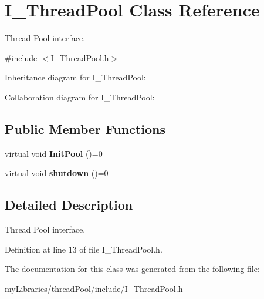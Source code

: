 \hypertarget{classI__ThreadPool}{}\section{I\+\_\+\+Thread\+Pool Class Reference}
\label{classI__ThreadPool}


Thread Pool interface.  




{\ttfamily \#include $<$I\+\_\+\+Thread\+Pool.\+h$>$}



Inheritance diagram for I\+\_\+\+Thread\+Pool\+:


Collaboration diagram for I\+\_\+\+Thread\+Pool\+:
\subsection*{Public Member Functions}
\begin{DoxyCompactItemize}
\item 
\mbox{\label{classI__ThreadPool_a28e12ea1cb5ee9c06a60f6dc1de49a58}} 
virtual void {\bfseries Init\+Pool} ()=0
\item 
\mbox{\label{classI__ThreadPool_a4d059af312bca3020454dab83a9a6604}} 
virtual void {\bfseries shutdown} ()=0
\end{DoxyCompactItemize}


\subsection{Detailed Description}
Thread Pool interface. 

Definition at line 13 of file I\+\_\+\+Thread\+Pool.\+h.



The documentation for this class was generated from the following file\+:\begin{DoxyCompactItemize}
\item 
my\+Libraries/thread\+Pool/include/I\+\_\+\+Thread\+Pool.\+h\end{DoxyCompactItemize}

